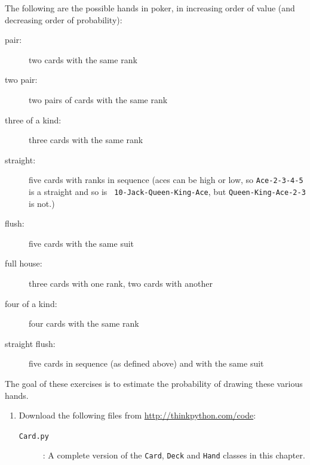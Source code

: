 \documentclass[10pt]{book}
\begin{document}
\begin{CJK}{UTF8}{gbsn}
\begin{exercise}
The following are the possible hands in poker, in increasing order
of value (and decreasing order of probability):

\begin{description}

\item[pair:] two cards with the same rank
\vspace{-0.05in}

\item[two pair:] two pairs of cards with the same rank
\vspace{-0.05in}

\item[three of a kind:] three cards with the same rank
\vspace{-0.05in}

\item[straight:] five cards with ranks in sequence (aces can
be high or low, so {\tt Ace-2-3-4-5} is a straight and so is {\tt
10-Jack-Queen-King-Ace}, but {\tt Queen-King-Ace-2-3} is not.)
\vspace{-0.05in}

\item[flush:] five cards with the same suit
\vspace{-0.05in}

\item[full house:] three cards with one rank, two cards with another
\vspace{-0.05in}

\item[four of a kind:] four cards with the same rank
\vspace{-0.05in}

\item[straight flush:] five cards in sequence (as defined above) and
with the same suit
\vspace{-0.05in}

\end{description}
%
The goal of these exercises is to estimate
the probability of drawing these various hands.

\begin{enumerate}

\item Download the following files from \url{http://thinkpython.com/code}:

\begin{description}

\item[{\tt Card.py}]: A complete version of the {\tt Card},
{\tt Deck} and {\tt Hand} classes in this chapter.


\end{description}
\end{enumerate}
\end{exercise}
\end{CJK}
\end{document}
